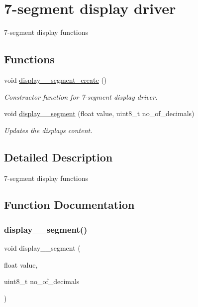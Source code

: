 \hypertarget{group__display}{}\section{7-\/segment display driver}
\label{group__display}


7-\/segment display functions  


\subsection*{Functions}
\begin{DoxyCompactItemize}
\item 
void \mbox{\hyperlink{group__display_ga5be3842cd6594bf8a0b03986fa56b134}{display\+\_\+\_\+segment\+\_\+create}} ()
\begin{DoxyCompactList}\small\item\em Constructor function for 7-\/segment display driver. \end{DoxyCompactList}\item 
void \mbox{\hyperlink{group__display_gadc40e19ce8637f7ae7361f589db1170d}{display\+\_\+\_\+segment}} (float value, uint8\+\_\+t no\+\_\+of\+\_\+decimals)
\begin{DoxyCompactList}\small\item\em Updates the display\textquotesingle{}s content. \end{DoxyCompactList}\end{DoxyCompactItemize}


\subsection{Detailed Description}
7-\/segment display functions 



\subsection{Function Documentation}
\mbox{\label{group__display_gadc40e19ce8637f7ae7361f589db1170d}} 
\subsubsection{\texorpdfstring{display\+\_\+\_\+segment()}{display\_7\_segment()}}
{\footnotesize\ttfamily void display\+\_\+\_\+segment (\begin{DoxyParamCaption}\item[{float}]{value,  }\item[{uint8\+\_\+t}]{no\+\_\+of\+\_\+decimals }\end{DoxyParamCaption})}



